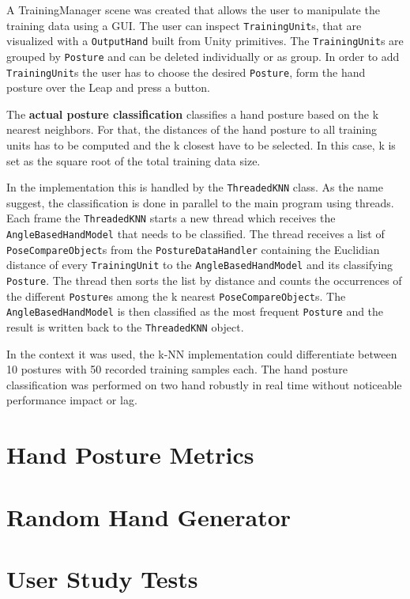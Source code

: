 A TrainingManager scene was created that allows the user to manipulate the training data using a GUI. The user can inspect \texttt{TrainingUnit}s, that are visualized with a \texttt{OutputHand} built from Unity primitives. The \texttt{TrainingUnit}s are grouped by \texttt{Posture} and can be deleted individually or as group. In order to add \texttt{TrainingUnit}s the user has to choose the desired \texttt{Posture}, form the hand posture over the Leap and press a button. 

The \textbf{actual posture classification} classifies a hand posture based on the k nearest neighbors. For that, the distances of the hand posture to all training units has to be computed and the k closest have to be selected. In this case, k is set as the square root of the total training data size.

In the implementation this is handled by the \texttt{ThreadedKNN} class. As the name suggest, the classification is done in parallel to the main program using threads. Each frame the \texttt{ThreadedKNN} starts a new thread which receives the \texttt{AngleBasedHandModel} that needs to be classified. The thread receives a list of \texttt{PoseCompareObject}s from the \texttt{PostureDataHandler} containing the Euclidian distance of every \texttt{TrainingUnit} to the \texttt{AngleBasedHandModel} and its classifying \texttt{Posture}. The thread then sorts the list by distance and counts the occurrences of the different \texttt{Posture}s among the k nearest \texttt{PoseCompareObject}s. The \texttt{AngleBasedHandModel} is then classified as the most frequent \texttt{Posture} and the result is written back to the \texttt{ThreadedKNN} object.

In the context it was used, the k-NN implementation could differentiate between 10 postures with 50 recorded training samples each. The hand posture classification was performed on two hand robustly in real time without noticeable performance impact or lag. 

\section{Hand Posture Metrics}\label{chapter:handosturemetric}

\section{Random Hand Generator}

\section{User Study Tests}

